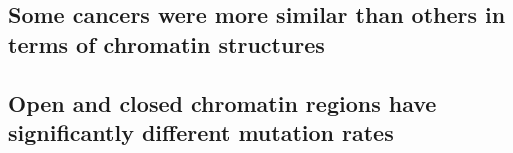 

\subsection{Some cancers were more similar than others in terms of chromatin structures}\label{gle:pca}



\subsection{Open and closed chromatin regions have significantly different mutation rates}\label{gle:g}

